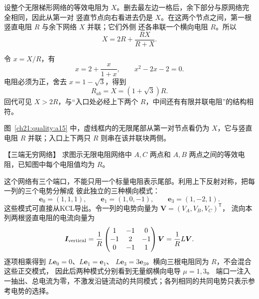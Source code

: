 {\begin{xesolution}
设整个无限梯形网络的等效电阻为 $X$。删去最左边一格后，余下部分与原网络完全相同，因此从第一对
竖直节点向右看进去仍是 $X$。在这两个节点之间，第一根竖直电阻 $R$ 与余下网络 $X$ 并联；它们外侧
还各串联一个横向电阻 $R$。所以
\[
  X=2R+\frac{RX}{R+X}.
\]

\par\noindent\begin{minipage}{\linewidth}
\ladderRecursionFigure
{}
\end{minipage}\par\medskip

令 $x=X/R$，有
\[
  x=2+\frac{x}{1+x},
  \qquad x^2-2x-2=0.
\]
电阻必须为正，舍去 $x=1-\sqrt3$，得到
\[
  \boxed{R_{ab}=X=(1+\sqrt3)R}.
\]
回代可见 $X>2R$，与“入口处必经上下两个 $R$，中间还有有限并联电阻”的结构相符。

图~\ref{ch21:quality:a15} 中，虚线框内的无限尾部从第一对节点看仍为 $X$，它与竖直电阻 $R$ 并联；入口上下两只 $R$ 则串在该并联块两侧。
\end{xesolution}



\begin{origexamplebox}{【三端无穷网络】}\label{ch21:ex:s37-6-8}
求图示无限电阻网络中 $A,C$ 两点和 $A,B$ 两点之间的等效电阻，已知图中每个电阻值均为 $R$。
\par\noindent\begin{minipage}{\linewidth}
\threeRailProblemFigure
{}
\end{minipage}\par\medskip
\end{origexamplebox}\par\nopagebreak[4]


\begin{xesolution}
这个网络有三个端口，不能只用一个标量电阻表示尾部。利用上下反射对称，把每一列的三个电势分解成
彼此独立的三种横向模式：
\[
  \boldsymbol e_0=(1,1,1),\qquad
  \boldsymbol e_1=(1,0,-1),\qquad
  \boldsymbol e_3=(1,-2,1).
\]
这些模式可直接从KCL导出。令一列的电势向量为 $\boldsymbol V=(V_A,V_B,V_C)^{\mathsf T}$，
流向本列两根竖直电阻的电流向量为
\[
 \boldsymbol I_{\rm vertical}=\frac1R
 \begin{pmatrix}1&-1&0\\-1&2&-1\\0&-1&1\end{pmatrix}\boldsymbol V
 =\frac1R L\boldsymbol V.
\]
逐项相乘得到 $L\boldsymbol e_0=0$、$L\boldsymbol e_1=\boldsymbol e_1$、
$L\boldsymbol e_3=3\boldsymbol e_3$。横向三根电阻同为 $R$，不会混合这些正交模式，
因此后两种模式分别看到无量纲横向电导 $\mu=1,3$。
端口一注入一抽出、总电流为零，不激发沿链流动的共同模式；各列相同的共同电势只表示参考电势的选择。


\end{xesolution}}
